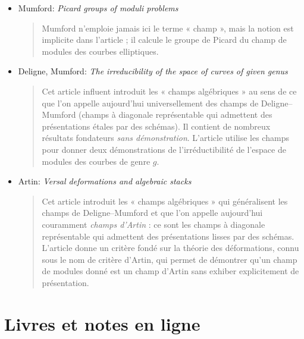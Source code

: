 \begin{itemize}
\item Mumford: \emph{Picard groups of moduli problems}
\cite{mumford_picard}
\begin{quote}
Mumford n'emploie jamais ici le terme « champ », mais la
notion est implicite dans l'article ; il calcule le groupe de Picard du champ
de modules des courbes elliptiques.
\end{quote}
\item Deligne, Mumford: \emph{The irreducibility of the space of curves of
given genus} \cite{DM}
\begin{quote}
Cet article influent introduit les « champs algébriques » au sens de ce que
l'on appelle aujourd'hui universellement des champs de Deligne--Mumford (champs à
diagonale représentable qui admettent des présentations étales par des schémas).
Il contient de nombreux résultats fondateurs \emph{sans démonstration}. L'article
utilise les champs pour donner deux démonstrations de l'irréductibilité de l'espace de modules des courbes de genre
$g$.
\end{quote}
\item Artin: \emph{Versal deformations and algebraic stacks}
\cite{ArtinVersal}
\begin{quote}
Cet article introduit les « champs algébriques » qui généralisent les champs de
Deligne--Mumford et que l'on appelle aujourd'hui couramment \emph{champs d'Artin} :
ce sont les champs à diagonale représentable qui admettent des présentations
lisses par des schémas. L'article donne un critère fondé sur la théorie des déformations,
connu sous le nom de critère d'Artin, qui permet de démontrer qu'un champ de
modules donné est un champ d'Artin sans exhiber explicitement de présentation.
\end{quote}
\end{itemize}




\section{Livres et notes en ligne}
\label{section-books}


